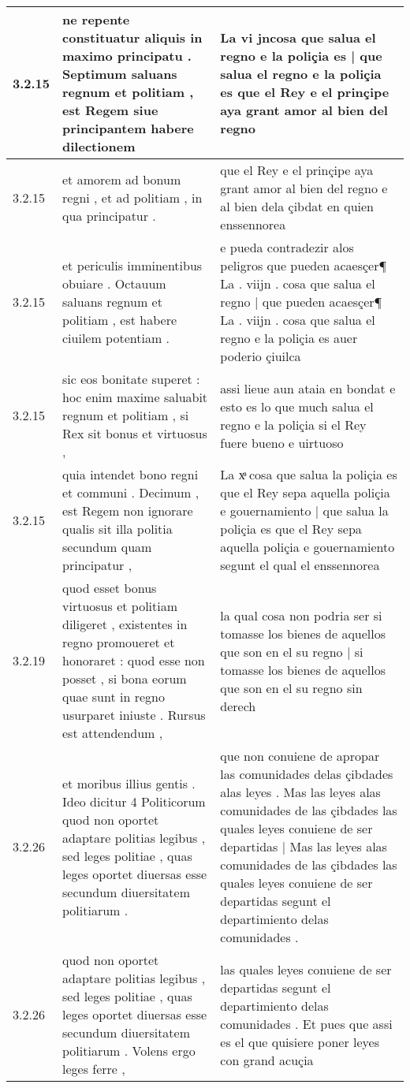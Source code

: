 \begin{tabular}{|p{1cm}|p{6.5cm}|p{6.5cm}|}
3.2.15 & ne repente constituatur aliquis in maximo principatu . Septimum saluans regnum et politiam , est Regem siue principantem habere dilectionem & La vi jncosa que salua el regno e la poliçia es | que salua el regno e la poliçia es que el Rey e el prinçipe aya grant amor al bien del regno \\\hline
3.2.15 & et amorem ad bonum regni , et ad politiam , in qua principatur . & que el Rey e el prinçipe aya grant amor al bien del regno e al bien dela çibdat en quien enssennorea \\\hline
3.2.15 & et periculis imminentibus obuiare . Octauum saluans regnum et politiam , est habere ciuilem potentiam . & e pueda contradezir alos peligros que pueden acaesçer¶ La . viijn . cosa que salua el regno | que pueden acaesçer¶ La . viijn . cosa que salua el regno e la poliçia es auer poderio çiuilca \\\hline
3.2.15 & sic eos bonitate superet : hoc enim maxime saluabit regnum et politiam , si Rex sit bonus et virtuosus , & assi lieue aun ataia en bondat e esto es lo que much salua el regno e la poliçia si el Rey fuere bueno e uirtuoso \\\hline
3.2.15 & quia intendet bono regni et communi . Decimum , est Regem non ignorare qualis sit illa politia secundum quam principatur , & La xͣ cosa que salua la poliçia es que el Rey sepa aquella poliçia e gouernamiento | que salua la poliçia es que el Rey sepa aquella poliçia e gouernamiento segunt el qual el enssennorea \\\hline
3.2.19 & quod esset bonus virtuosus et politiam diligeret , existentes in regno promoueret et honoraret : quod esse non posset , si bona eorum quae sunt in regno usurparet iniuste . Rursus est attendendum , & la qual cosa non podria ser si tomasse los bienes de aquellos que son en el su regno | si tomasse los bienes de aquellos que son en el su regno sin derech \\\hline
3.2.26 & et moribus illius gentis . Ideo dicitur 4 Politicorum quod non oportet adaptare politias legibus , sed leges politiae , quas leges oportet diuersas esse secundum diuersitatem politiarum . & que non conuiene de apropar las comunidades delas çibdades alas leyes . Mas las leyes alas comunidades de las çibdades las quales leyes conuiene de ser departidas | Mas las leyes alas comunidades de las çibdades las quales leyes conuiene de ser departidas segunt el departimiento delas comunidades . \\\hline
3.2.26 & quod non oportet adaptare politias legibus , sed leges politiae , quas leges oportet diuersas esse secundum diuersitatem politiarum . Volens ergo leges ferre , & las quales leyes conuiene de ser departidas segunt el departimiento delas comunidades . Et pues que assi es el que quisiere poner leyes con grand acuçia \\\hline

\end{tabular}
